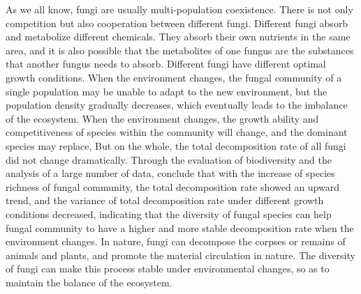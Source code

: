 \documentclass{mcmthesis}
\begin{document}
\begin{appendices}
As we all know, fungi are usually multi-population coexistence. There is not only competition but also cooperation between different fungi. Different fungi absorb and metabolize different chemicals. They absorb their own nutrients in the same area, and it is also possible that the metabolites of one fungus are the substances that another fungus needs to absorb. Different fungi have different optimal growth conditions. When the environment changes, the fungal community of a single population may be unable to adapt to the new environment, but the population density gradually decreases, which eventually leads to the imbalance of the ecosystem. When the environment changes, the growth ability and competitiveness of species within the community will change, and the dominant species may replace, But on the whole, the total decomposition rate of all fungi did not change dramatically. Through the evaluation of biodiversity and the analysis of a large number of data, conclude that with the increase of species richness of fungal community, the total decomposition rate showed an upward trend, and the variance of total decomposition rate under different growth conditions decreased, indicating that the diversity of fungal species can help fungal community to have a higher and more stable decomposition rate when the environment changes. In nature, fungi can decompose the corpses or remains of animals and plants, and promote the material circulation in nature. The diversity of fungi can make this process stable under environmental changes, so as to maintain the balance of the ecosystem.


% 
\end{appendices}
\end{document}
